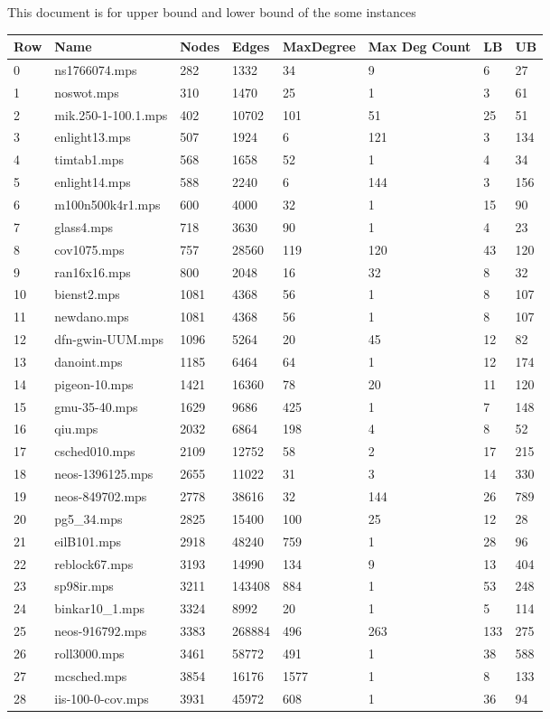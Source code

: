\documentclass{article}
\begin{document}
This document is for upper bound and lower bound of the some instances
\begin{longtable}{|l |l |l |l |l |l |l |l |}
\hline
Row&Name&Nodes&Edges&MaxDegree&Max Deg Count&LB&UB\\
\hline
0&ns1766074.mps&282&1332&34&9&6&27\\
1&noswot.mps&310&1470&25&1&3&61\\
2&mik.250-1-100.1.mps&402&10702&101&51&25&51\\
3&enlight13.mps&507&1924&6&121&3&134\\
4&timtab1.mps&568&1658&52&1&4&34\\
5&enlight14.mps&588&2240&6&144&3&156\\
6&m100n500k4r1.mps&600&4000&32&1&15&90\\
7&glass4.mps&718&3630&90&1&4&23\\
8&cov1075.mps&757&28560&119&120&43&120\\
9&ran16x16.mps&800&2048&16&32&8&32\\
10&bienst2.mps&1081&4368&56&1&8&107\\
11&newdano.mps&1081&4368&56&1&8&107\\
12&dfn-gwin-UUM.mps&1096&5264&20&45&12&82\\
13&danoint.mps&1185&6464&64&1&12&174\\
14&pigeon-10.mps&1421&16360&78&20&11&120\\
15&gmu-35-40.mps&1629&9686&425&1&7&148\\
16&qiu.mps&2032&6864&198&4&8&52\\
17&csched010.mps&2109&12752&58&2&17&215\\
18&neos-1396125.mps&2655&11022&31&3&14&330\\
19&neos-849702.mps&2778&38616&32&144&26&789\\
20&pg5_34.mps&2825&15400&100&25&12&28\\
21&eilB101.mps&2918&48240&759&1&28&96\\
22&reblock67.mps&3193&14990&134&9&13&404\\
23&sp98ir.mps&3211&143408&884&1&53&248\\
24&binkar10_1.mps&3324&8992&20&1&5&114\\
25&neos-916792.mps&3383&268884&496&263&133&275\\
26&roll3000.mps&3461&58772&491&1&38&588\\
27&mcsched.mps&3854&16176&1577&1&8&133\\
28&iis-100-0-cov.mps&3931&45972&608&1&36&94\\

\end{longtable}
\end{document}
